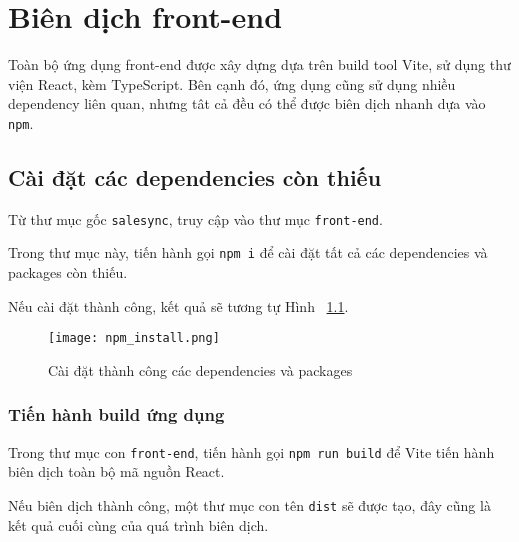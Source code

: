 \chapter{Biên dịch front-end}
\label{Chapter3}

Toàn bộ ứng dụng front-end được xây dựng dựa trên build tool Vite, sử dụng thư viện React, kèm TypeScript. Bên cạnh đó, ứng dụng cũng sử dụng nhiều dependency liên quan, nhưng tât cả đều có thể được biên dịch nhanh dựa vào \texttt{npm}.

\section{Cài đặt các dependencies còn thiếu}
Từ thư mục gốc \texttt{salesync}, truy cập vào thư mục \texttt{front-end}.

Trong thư mục này, tiến hành gọi \texttt{npm i} để cài đặt tất cả các dependencies và packages còn thiếu.

Nếu cài đặt thành công, kết quả sẽ tương tự Hình ~\ref{figure:npm_install}.
\begin{figure}[ht]
    \centering
    \texttt{[image: npm\_install.png]}
    \caption{Cài đặt thành công các dependencies và packages}
    \label{figure:npm_install}
\end{figure}

\subsection{Tiến hành build ứng dụng}
Trong thư mục con \texttt{front-end}, tiến hành gọi \texttt{npm run build} để Vite tiến hành biên dịch toàn bộ mã nguồn React.

Nếu biên dịch thành công, một thư mục con tên \texttt{dist} sẽ được tạo, đây cũng là kết quả cuối cùng của quá trình biên dịch.
